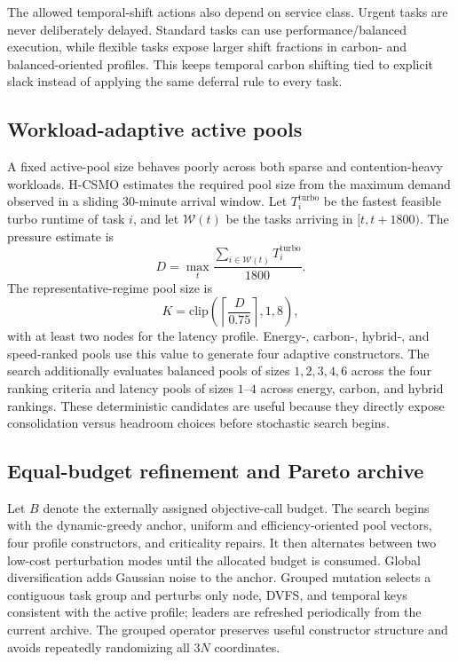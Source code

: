 \documentclass[preprint,12pt]{elsarticle}
\newcommand{\method}{H-CSMO\xspace}
\begin{document}
The allowed temporal-shift actions also depend on service class. Urgent tasks are never deliberately delayed. Standard tasks can use performance/balanced execution, while flexible tasks expose larger shift fractions in carbon- and balanced-oriented profiles. This keeps temporal carbon shifting tied to explicit slack instead of applying the same deferral rule to every task.

\subsection{Workload-adaptive active pools}

A fixed active-pool size behaves poorly across both sparse and contention-heavy workloads. \method estimates the required pool size from the maximum demand observed in a sliding 30-minute arrival window. Let $T_i^{\mathrm{turbo}}$ be the fastest feasible turbo runtime of task $i$, and let $\mathcal{W}(t)$ be the tasks arriving in $[t,t+1800)$. The pressure estimate is
\begin{equation}
D=\max_t\frac{\sum_{i\in\mathcal{W}(t)}T_i^{\mathrm{turbo}}}{1800}.
\end{equation}
The representative-regime pool size is
\begin{equation}
K=\mathrm{clip}\left(\left\lceil\frac{D}{0.75}\right\rceil,1,8\right),
\label{eq:pool-size}
\end{equation}
with at least two nodes for the latency profile. Energy-, carbon-, hybrid-, and speed-ranked pools use this value to generate four adaptive constructors. The search additionally evaluates balanced pools of sizes $1,2,3,4,6$ across the four ranking criteria and latency pools of sizes $1$--$4$ across energy, carbon, and hybrid rankings. These deterministic candidates are useful because they directly expose consolidation versus headroom choices before stochastic search begins.

\subsection{Equal-budget refinement and Pareto archive}

Let $B$ denote the externally assigned objective-call budget. The search begins with the dynamic-greedy anchor, uniform and efficiency-oriented pool vectors, four profile constructors, and criticality repairs. It then alternates between two low-cost perturbation modes until the allocated budget is consumed. Global diversification adds Gaussian noise to the anchor. Grouped mutation selects a contiguous task group and perturbs only node, DVFS, and temporal keys consistent with the active profile; leaders are refreshed periodically from the current archive. The grouped operator preserves useful constructor structure and avoids repeatedly randomizing all $3N$ coordinates.
\end{document}
